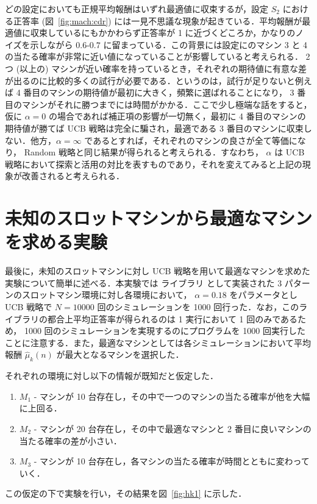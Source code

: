\documentclass{jsarticle}
\def\hmukn{\hat{\mu}_k (n)}
\begin{document}
どの設定においても正規平均報酬はいずれ最適値に収束するが，設定 $S_2$ における正答率 (図~\ref{fig:mach:cdr}) には一見不思議な現象が起きている．平均報酬が最適値に収束しているにもかかわらず正答率が 1 に近づくどころか，かなりのノイズを示しながら $0.6$-$0.7$ に留まっている．この背景には設定にのマシン 3 と 4 の当たる確率が非常に近い値になっていることが影響していると考えられる． 2 つ (以上の) マシンが近い確率を持っているとき，それぞれの期待値に有意な差が出るのに比較的多くの試行が必要である．というのは，試行が足りないと例えば 4 番目のマシンの期待値が最初に大きく，頻繁に選ばれることになり， 3 番目のマシンがそれに勝つまでには時間がかかる．ここで少し極端な話をすると，仮に $\alpha = 0$ の場合であれば補正項の影響が一切無く，最初に 4 番目のマシンの期待値が勝てば UCB 戦略は完全に騙され，最適である 3 番目のマシンに収束しない．他方，$ \alpha = \infty$ であるとすれば，それぞれのマシンの良さが全て等価になり， Random 戦略と同じ結果が得られると考えられる．すなわち， $\alpha$ は UCB 戦略において探索と活用の対比を表すものであり，それを変えてみると上記の現象が改善されると考えられる．

\section{未知のスロットマシンから最適なマシンを求める実験}\label{sec:hk1}

最後に，未知のスロットマシンに対し UCB 戦略を用いて最適なマシンを求めた実験について簡単に述べる．本実験では ライブラリ として実装された 3 パターンのスロットマシン環境に対し各環境において， $\alpha = 0.18$ をパラメータとし UCB 戦略で $N = 10000$ 回のシミュレーションを 1000 回行った．なお，このライブラリの都合上平均正答率が得られるのは 1 実行において 1 回のみであるため， 1000 回のシミュレーションを実現するのにプログラムを 1000 回実行したことに注意する．また，最適なマシンとしては各シミュレーションにおいて平均報酬 $\hmukn$ が最大となるマシンを選択した．

それぞれの環境に対し以下の情報が既知だと仮定した．
\begin{enumerate}
\item $M_1$ - マシンが 10 台存在し，その中で一つのマシンの当たる確率が他を大幅に上回る．
\item $M_2$ - マシンが 20 台存在し，その中で最適なマシンと 2 番目に良いマシンの当たる確率の差が小さい．
\item $M_3$ - マシンが 10 台存在し，各マシンの当たる確率が時間とともに変わっていく．
\end{enumerate}
この仮定の下で実験を行い，その結果を図~\ref{fig:hk1} に示した．
\end{document}
